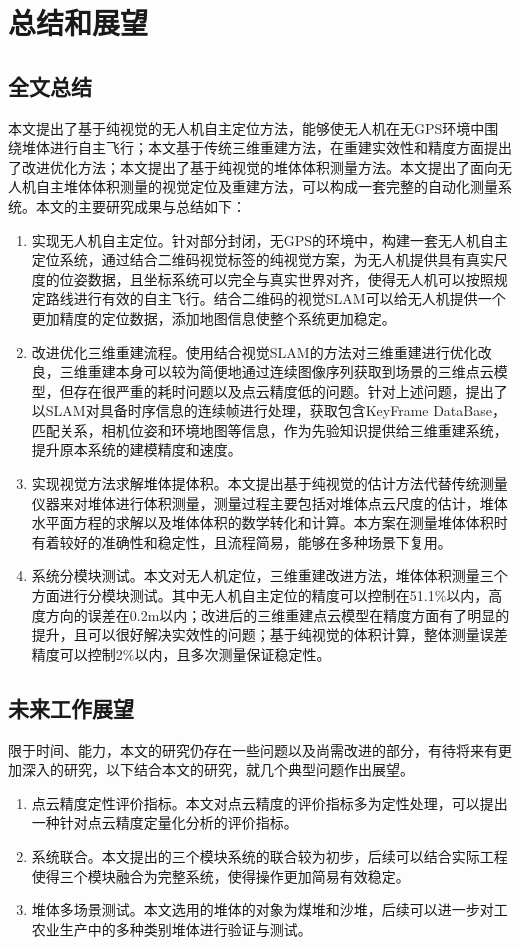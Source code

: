 \chapter{总结和展望}
\label{cha:chap6}
\section{全文总结}
\label{sec:6.1}
\label{sec:all:summary}
本文提出了基于纯视觉的无人机自主定位方法，能够使无人机在无GPS环境中围绕堆体进行自主飞行；本文基于传统三维重建方法，在重建实效性和精度方面提出了改进优化方法；本文提出了基于纯视觉的堆体体积测量方法。本文提出了面向无人机自主堆体体积测量的视觉定位及重建方法，可以构成一套完整的自动化测量系统。本文的主要研究成果与总结如下：
\begin{enumerate}
    \item 实现无人机自主定位。针对部分封闭，无GPS的环境中，构建一套无人机自主定位系统，通过结合二维码视觉标签的纯视觉方案，为无人机提供具有真实尺度的位姿数据，且坐标系统可以完全与真实世界对齐，使得无人机可以按照规定路线进行有效的自主飞行。结合二维码的视觉SLAM可以给无人机提供一个更加精度的定位数据，添加地图信息使整个系统更加稳定。
    \item 改进优化三维重建流程。使用结合视觉SLAM的方法对三维重建进行优化改良，三维重建本身可以较为简便地通过连续图像序列获取到场景的三维点云模型，但存在很严重的耗时问题以及点云精度低的问题。针对上述问题，提出了以SLAM对具备时序信息的连续帧进行处理，获取包含KeyFrame DataBase，匹配关系，相机位姿和环境地图等信息，作为先验知识提供给三维重建系统，提升原本系统的建模精度和速度。
    \item 实现视觉方法求解堆体提体积。本文提出基于纯视觉的估计方法代替传统测量仪器来对堆体进行体积测量，测量过程主要包括对堆体点云尺度的估计，堆体水平面方程的求解以及堆体体积的数学转化和计算。本方案在测量堆体体积时有着较好的准确性和稳定性，且流程简易，能够在多种场景下复用。
    \item 系统分模块测试。本文对无人机定位，三维重建改进方法，堆体体积测量三个方面进行分模块测试。其中无人机自主定位的精度可以控制在51.1$\%$以内，高度方向的误差在0.2m以内；改进后的三维重建点云模型在精度方面有了明显的提升，且可以很好解决实效性的问题；基于纯视觉的体积计算，整体测量误差精度可以控制2$\%$以内，且多次测量保证稳定性。
\end{enumerate}

\section{未来工作展望}
限于时间、能力，本文的研究仍存在一些问题以及尚需改进的部分，有待将来有更加深入的研究，以下结合本文的研究，就几个典型问题作出展望。
\begin{enumerate}
    \item 点云精度定性评价指标。本文对点云精度的评价指标多为定性处理，可以提出一种针对点云精度定量化分析的评价指标。
    \item 系统联合。本文提出的三个模块系统的联合较为初步，后续可以结合实际工程使得三个模块融合为完整系统，使得操作更加简易有效稳定。
    \item 堆体多场景测试。本文选用的堆体的对象为煤堆和沙堆，后续可以进一步对工农业生产中的多种类别堆体进行验证与测试。
    \end{enumerate}

    






   
